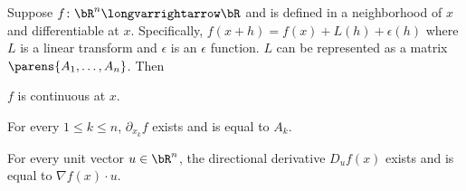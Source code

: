 \documentclass[10pt]{article}
\begin{document}


\bigskip

\begin{prop*}

    Suppose $f\colon\bR^n\longvarrightarrow\bR$ and is defined in a neighborhood of $x$ and differentiable at $x$.
    Specifically, $f(x+h)=f(x)+L(h)+\epsilon(h)$ where $L$ is a linear transform and $\epsilon$ is an $\epsilon$ function.
    $L$ can be represented as a matrix $\parens{A_1,\dots,A_n}$.
    Then
    \benum
        \item $f$ is continuous at $x$.
        \item For every $1\leq k\leq n$, $\partial_{x_k}f$ exists and is equal to $A_k$.
        \item For every unit vector $u\in\bR^n$, the directional derivative $D_uf(x)$ exists and is equal to $\nabla f(x)\cdot u$.
    \eenum

\end{prop*}
\end{document}
